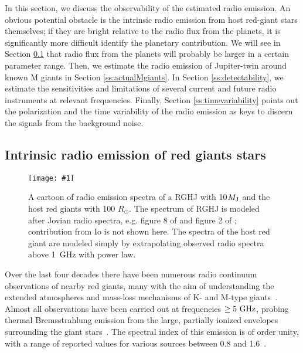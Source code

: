\documentclass[iop,numberedappendix,apj]{emulateapj}
\def\plotonesc#1{\centering \leavevmode
\texttt{[image: \#1]}}
\begin{document}
In this section, we discuss the observability of the estimated radio emission. 
An obvious potential obstacle is the intrinsic radio emission from host red-giant stars themselves; if they are bright relative to the radio flux from the planets, it is significantly more difficult identify the planetary contribution.
We will see in Section \ref{ss:RGradio} that radio flux from the planets will probably be larger in a certain parameter range. 
Then, we estimate the radio emission of Jupiter-twin around known M giants in Section \ref{ss:actualMgiants}. 
In Section \ref{ss:detectability}, we estimate the sensitivities and limitations of several current and future
radio instruments at relevant frequencies.
Finally, Section \ref{ss:timevariability} points out the polarization and the time variability of the radio emission as keys to discern the signals from the background noise. 


\subsection{Intrinsic radio emission of red giants stars}
\label{ss:RGradio}


\begin{figure*}[tbp]
   \plotonesc{cartoon_10Mj_100pc_smooth.pdf}
   \caption{A cartoon of radio emission spectra of a RGHJ with 10$M_{\rm J}$ and the host red giants with 100 $R_{\odot }$.
The spectrum of RGHJ is modeled after Jovian radio spectra, e.g. figure 8 of \citet{zarka_et_al2004} and figure 2 of \citet{griesmeier2007a}; contribution from Io is not shown here.
The spectra of the host red giant are modeled simply by extrapolating observed radio spectra above 1~GHz with power law. }
  \label{fig:cartoon}
\end{figure*}



Over the last four decades there have been numerous radio continuum observations of nearby red giants, many with the aim of understanding the extended atmospheres and mass-loss mechanisms of K- and M-type giants~\citep[e.g.,][]{Newell1982, Knapp1995, Skinner1997, Lim1998, OGorman2013}.
Almost all observations have been carried out 
at frequencies $\geq 5~\rm GHz$, 
probing thermal Bremsstrahlung emission from the large, partially ionized envelopes surrounding the giant stars~\citep{drake1986}.
The spectral index of this emission is of order unity, with a range of reported values for various sources between 0.8 and 1.6~\citep{OGorman2013}.
\end{document}
